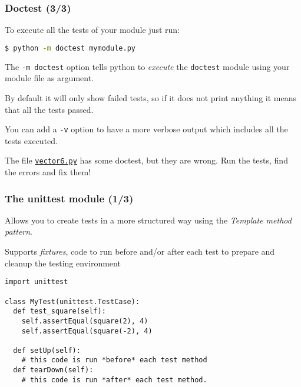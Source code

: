 \documentclass[english,serif,mathserif,xcolor=pdftex,dvipsnames,table]{beamer}
\begin{document}
\begin{frame}[fragile]
  \frametitle{Doctest (3/3)}

  To execute all the tests of your module just run:
\+
\begin{lstlisting}[language=sh]
$ python -m doctest mymodule.py
  \end{lstlisting}

  \+
  The \lstinline|-m doctest| option tells python to \textit{execute} the
  \lstinline|doctest| module using your module file as argument.

  \+
  By default it will only show failed tests, so if it does not print
  anything it means that all the tests passed.

  \+
  You can add a \lstinline|-v| option to have a more verbose output
  which includes all the tests executed.






\end{frame}

\begin{frame}
\+
\begin{exercise}
  The file
  \href{http://www.gc3.uzh.ch/vector6.py}{\texttt{vector6.py}}
  has some doctest, but they are wrong. Run the tests, find the errors
  and fix them!
\end{exercise}

\end{frame}


\begin{frame}[fragile]
  \frametitle{The unittest module (1/3)}
  Allows you to create tests in a more structured way using the
  \textit{Template method pattern}.

  \+
  Supports \textit{fixtures}, code to run before and/or after each
  test to prepare and cleanup the testing environment

  \begin{lstlisting}
import unittest

class MyTest(unittest.TestCase):
  def test_square(self):
    self.assertEqual(square(2), 4)
    self.assertEqual(square(-2), 4)

  def setUp(self):
    # this code is run *before* each test method
  def tearDown(self):
    # this code is run *after* each test method.
  \end{lstlisting}
\end{frame}
\end{document}
